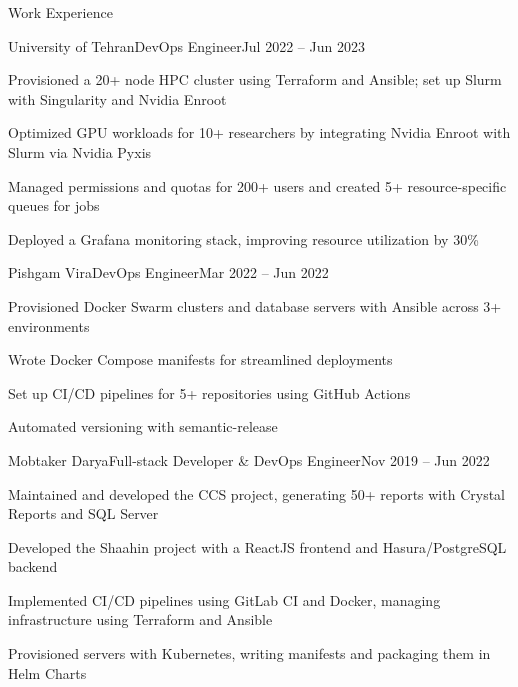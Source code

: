 \documentclass[]{main}
\begin{document}
\begin{section}{Work Experience}
 \begin{subsection}{University of Tehran}{DevOps Engineer}{Jul 2022 -- Jun 2023}{}
     \item Provisioned a 20+ node HPC cluster using Terraform and Ansible; set up Slurm with Singularity and Nvidia Enroot
     \item Optimized GPU workloads for 10+ researchers by integrating Nvidia Enroot with Slurm via Nvidia Pyxis
     \item Managed permissions and quotas for 200+ users and created 5+ resource-specific queues for jobs
     \item Deployed a Grafana monitoring stack, improving resource utilization by 30\%
 \end{subsection}

 \begin{subsection}{Pishgam Vira}{DevOps Engineer}{Mar 2022 -- Jun 2022}{}
     \item Provisioned Docker Swarm clusters and database servers with Ansible across 3+ environments
     \item Wrote Docker Compose manifests for streamlined deployments
     \item Set up CI/CD pipelines for 5+ repositories using GitHub Actions
     \item Automated versioning with semantic-release
 \end{subsection}

 \begin{subsection}{Mobtaker Darya}{Full-stack Developer \& DevOps Engineer}{Nov 2019 -- Jun 2022}{}
     \item Maintained and developed the CCS project, generating 50+ reports with Crystal Reports and SQL Server
     \item Developed the Shaahin project with a ReactJS frontend and Hasura/PostgreSQL backend
     \item Implemented CI/CD pipelines using GitLab CI and Docker, managing infrastructure using Terraform and Ansible
     \item Provisioned servers with Kubernetes, writing manifests and packaging them in Helm Charts
 \end{subsection}


\end{section}
\end{document}
